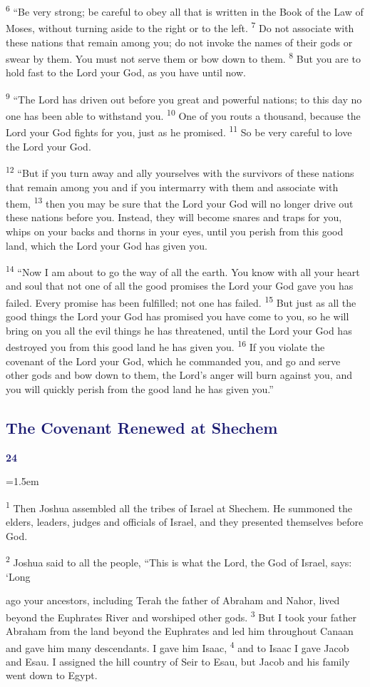 \documentclass[12pt,twoside]{article}
\newcommand{\vs}[1]{\textsuperscript{#1}}
\newcommand{\chapterWithBigIndent}[2]{%
  \noindent
  \begin{minipage}[t]{1cm}
    \vspace{-0.4\baselineskip}
    {\textcolor{MidnightBlue}{\fontsize{40pt}{48pt}\selectfont \textbf{#1}}}
  \end{minipage}%
  \hspace{0.9cm}%
  \begin{minipage}[t]{\dimexpr\linewidth - 1.5cm - 0.3cm\relax}
    \hangindent=1.5em
    \hangafter=3
    #2
    \vspace{0.05cm}
  \end{minipage}
}
\begin{document}
\vs{6} ``Be very strong; be careful to obey all that is written in the Book of the Law of Moses, without turning aside to the right or to the left.
\vs{7} Do not associate with these nations that remain among you; do not invoke the names of their gods or swear by them. You must not serve them or bow down to them.
\vs{8} But you are to hold fast to the Lord your God, as you have until now.

\vs{9} ``The Lord has driven out before you great and powerful nations; to this day no one has been able to withstand you.
\vs{10} One of you routs a thousand, because the Lord your God fights for you, just as he promised.
\vs{11} So be very careful to love the Lord your God.

\vs{12} ``But if you turn away and ally yourselves with the survivors of these nations that remain among you and if you intermarry with them and associate with them,
\vs{13} then you may be sure that the Lord your God will no longer drive out these nations before you. Instead, they will become snares and traps for you, whips on your backs and thorns in your eyes, until you perish from this good land, which the Lord your God has given you.

\vs{14} ``Now I am about to go the way of all the earth. You know with all your heart and soul that not one of all the good promises the Lord your God gave you has failed. Every promise has been fulfilled; not one has failed.
\vs{15} But just as all the good things the Lord your God has promised you have come to you, so he will bring on you all the evil things he has threatened, until the Lord your God has destroyed you from this good land he has given you.
\vs{16} If you violate the covenant of the Lord your God, which he commanded you, and go and serve other gods and bow down to them, the Lord's anger will burn against you, and you will quickly perish from the good land he has given you.''

\subsection*{\textcolor{MidnightBlue}{\textbf{The Covenant Renewed at Shechem}}}

\chapterWithBigIndent{24}{
  \vs{1} Then Joshua assembled all the tribes of Israel at Shechem. He summoned the elders, leaders, judges and officials of Israel, and they presented themselves before God.

  \vs{2} Joshua said to all the people, ``This is what the Lord, the God of Israel, says: `Long
}
\noindent ago your ancestors, including Terah the father of Abraham and Nahor, lived beyond the Euphrates River and worshiped other gods.
\vs{3} But I took your father Abraham from the land beyond the Euphrates and led him throughout Canaan and gave him many descendants. I gave him Isaac,
\vs{4} and to Isaac I gave Jacob and Esau. I assigned the hill country of Seir to Esau, but Jacob and his family went down to Egypt.
\end{document}
